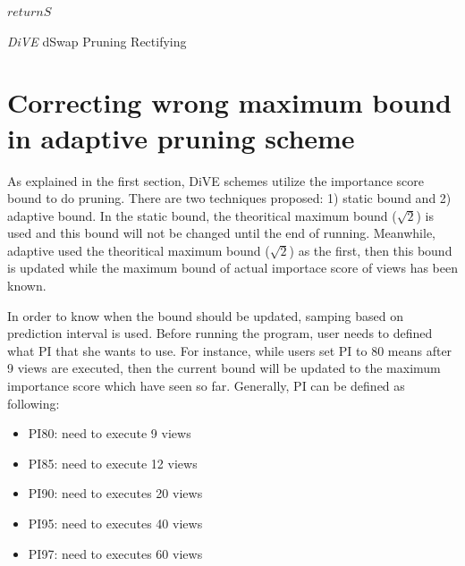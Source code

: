 \documentclass{article}
\begin{document}
\begin{algorithm}
{{			
			
			
		}
		
	}
	$return S$
	\caption{\textit{DiVE} dSwap Pruning Rectifying}\label{DiVE-dSwap-Pruning-Rectifying}
\end{algorithm}




\section{Correcting wrong maximum bound in adaptive pruning scheme}


As explained in the first section, DiVE schemes utilize the importance score bound to do pruning. There are two techniques proposed: 1) static bound and 2) adaptive bound. In the static bound, the theoritical maximum bound ($ \sqrt{2} $) is used and this bound will not be changed until the end of running. Meanwhile, adaptive used the theoritical maximum bound ($ \sqrt{2} $) as the first, then this bound is updated while the maximum bound of actual importace score of views has been known. 


In order to know when the bound should be updated, samping based on prediction interval is used. Before running the program, user needs to defined what PI that she wants to use. For instance, while users set PI to 80 means after 9 views are executed, then the current bound will be updated to the maximum importance score which have seen so far. Generally, PI can be defined as following: 

\begin{itemize}[noitemsep]
	\item PI80: need to execute 9 views
	\item PI85: need to execute 12 views
	\item PI90: need to executes 20 views
	\item PI95: need to executes 40 views
	\item PI97: need to executes 60 views
\end{itemize}
\end{document}
